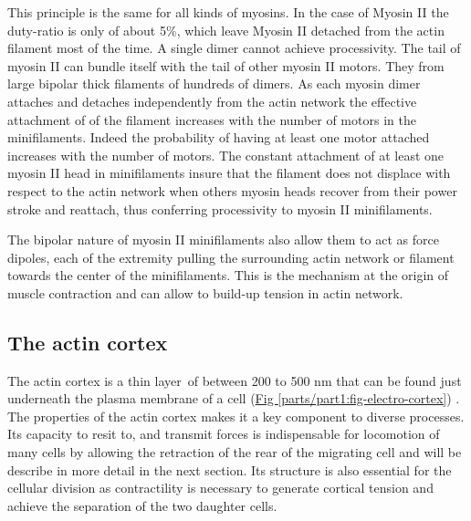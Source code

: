 \documentclass[A4paperpaper,11pt,english]{sphinxmanual}
\begin{document}
This principle is the same for all kinds of myosins. In the case of Myosin II
the duty-ratio is only of about 5\%, which leave Myosin II detached from the
actin filament most of the time. A single dimer cannot achieve
processivity.   The tail of myosin II can bundle itself with the tail of other
myosin II motors.  They from large bipolar thick filaments of hundreds of dimers.
As each myosin dimer attaches and detaches independently from the actin
network the effective attachment of of the filament increases with the number
of motors in the minifilaments. Indeed the probability of having at least one
motor attached increases with the number of motors. The constant attachment of
at least one myosin II head in minifilaments insure that the filament does not
displace with respect to the actin network when others myosin heads recover
from their power stroke and reattach, thus conferring processivity to myosin II
minifilaments.

The bipolar nature of myosin II minifilaments also allow them to act as force
dipoles, each  of the extremity pulling the surrounding actin network or
filament towards the center of the minifilaments. This is the mechanism at the
origin of muscle contraction and can allow to build-up tension in actin network.


\subsection{The actin cortex}
\label{parts/part1:the-actin-cortex}
The actin cortex is a thin layer of between 200 to 500 nm that can be found
just underneath the plasma membrane of a cell (\hyperref[parts/part1:fig-electro-cortex]{Fig  \ref*{parts/part1:fig-electro-cortex}}) . The properties of the actin
cortex makes it a key component to diverse processes.  Its capacity to resit
to, and transmit forces is indispensable for locomotion of many cells by
allowing the retraction of the rear of the migrating cell and will be describe
in more detail in the next section. Its structure is also essential for the
cellular division as contractility is necessary to generate cortical tension
and achieve the separation of the two daughter cells.
\end{document}
